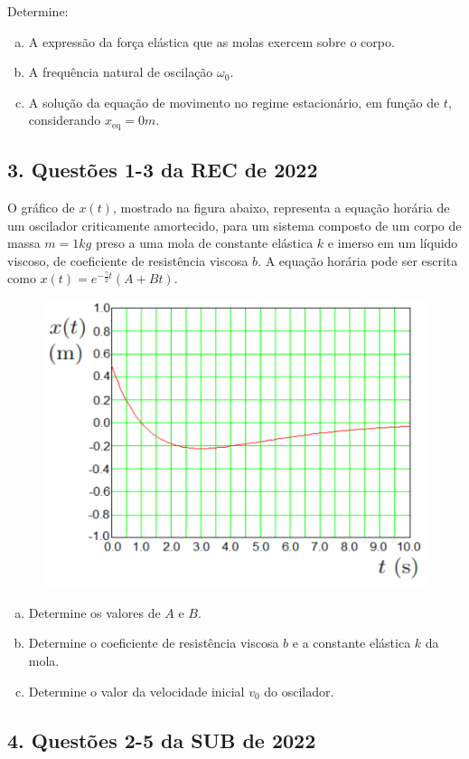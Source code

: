 \documentclass[a4paper,10pt]{article}
\begin{document}
Determine:
\begin{enumerate}[(a)]
\item A expressão da força elástica que as molas exercem sobre o corpo.

\item A frequência natural de oscilação $\omega_0$.

\item A solução da equação de movimento no regime estacionário, em função de $t$,
considerando $x_{\text{eq}}=0 \unit{m}$.
\end{enumerate}


\subsection*{3. Questões 1-3 da REC de 2022}

O gráfico de $x(t)$, mostrado na figura abaixo, representa a equação
horária de um oscilador criticamente amortecido, para um sistema composto de um corpo de massa
$m = 1 \unit{kg}$ preso a uma mola de constante elástica $k$ e imerso em um líquido viscoso, de coeficiente
de resistência viscosa $b$. A equação horária pode ser escrita como $x(t) = e^{-\frac{\gamma}{2} t} (A + Bt)$.
\begin{figure}[H]
\centering
\includegraphics[width=0.45\linewidth]{fig/grafico_rec.png}
\label{fig:grafico_rec}
\end{figure}

\begin{enumerate}[(a)]
\item Determine os valores de $A$ e $B$.

\item Determine o coeficiente de resistência viscosa $b$ e a constante elástica $k$ da mola.

\item Determine o valor da velocidade inicial $v_0$ do oscilador.
\end{enumerate}


\subsection*{4. Questões 2-5 da SUB de 2022}
\end{document}
